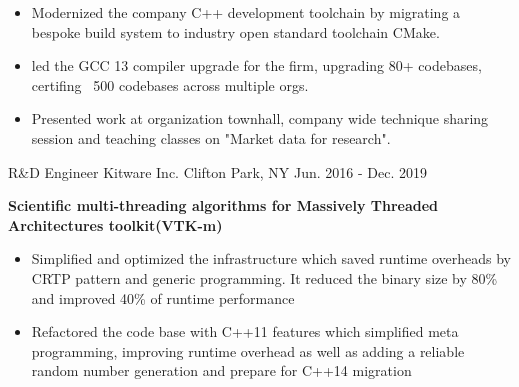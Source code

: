 \begin{cventries}
{\begin{cvitems}
\begin{itemize}
            \item {Modernized the company C++ development toolchain by migrating a bespoke build system to industry open standard toolchain CMake.}
            \item {led the GCC 13 compiler upgrade for the firm, upgrading 80+ codebases, certifing ~500 codebases across multiple orgs.}
            \item {Presented work at organization townhall, company wide technique sharing session and teaching classes on "Market data for research".}
          \end{itemize}
      \end{cvitems}
      \vspace{0.3cm}
    }
  \cventry
    {R\&D Engineer} %
    {Kitware Inc.} %
    {Clifton Park, NY} %
    {Jun. 2016 - Dec. 2019} %
    {
      \begin{cvitems} %
        \item {\fontsize{10pt}{1em}\bodyfont\bfseries\color{darktext}Scientific multi-threading algorithms for Massively Threaded Architectures toolkit(VTK-m)}
          \begin{itemize}
              \item {Simplified and optimized the infrastructure which saved runtime overheads by CRTP pattern and generic programming. It reduced the binary size by 80\% and improved 40\% of runtime performance}
              \item {Refactored the code base with C++11 features which simplified meta programming, improving runtime overhead as well as adding a reliable random number generation and prepare for C++14 migration}
          \end{itemize}

\end{cvitems}}
\end{cventries}
